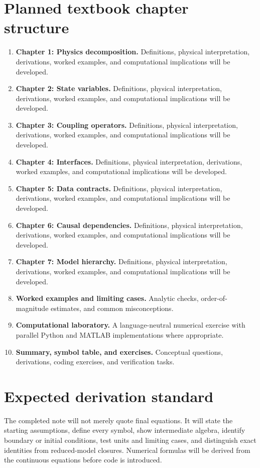 \documentclass[11pt]{article}
\begin{document}
\section{Planned textbook chapter structure}
\begin{enumerate}[leftmargin=1.8em]
\item \textbf{Chapter 1: Physics decomposition.} Definitions, physical interpretation, derivations, worked examples, and computational implications will be developed.
\item \textbf{Chapter 2: State variables.} Definitions, physical interpretation, derivations, worked examples, and computational implications will be developed.
\item \textbf{Chapter 3: Coupling operators.} Definitions, physical interpretation, derivations, worked examples, and computational implications will be developed.
\item \textbf{Chapter 4: Interfaces.} Definitions, physical interpretation, derivations, worked examples, and computational implications will be developed.
\item \textbf{Chapter 5: Data contracts.} Definitions, physical interpretation, derivations, worked examples, and computational implications will be developed.
\item \textbf{Chapter 6: Causal dependencies.} Definitions, physical interpretation, derivations, worked examples, and computational implications will be developed.
\item \textbf{Chapter 7: Model hierarchy.} Definitions, physical interpretation, derivations, worked examples, and computational implications will be developed.
\item \textbf{Worked examples and limiting cases.} Analytic checks, order-of-magnitude estimates, and common misconceptions.
\item \textbf{Computational laboratory.} A language-neutral numerical exercise with parallel Python and MATLAB implementations where appropriate.
\item \textbf{Summary, symbol table, and exercises.} Conceptual questions, derivations, coding exercises, and verification tasks.
\end{enumerate}

\section{Expected derivation standard}
The completed note will not merely quote final equations. It will state the starting assumptions, define every symbol, show intermediate algebra, identify boundary or initial conditions, test units and limiting cases, and distinguish exact identities from reduced-model closures. Numerical formulas will be derived from the continuous equations before code is introduced.
\end{document}
